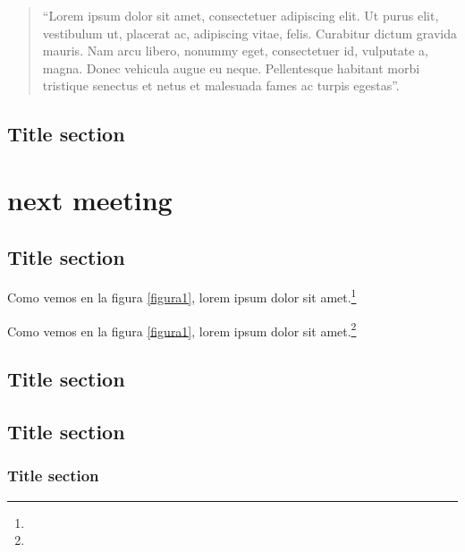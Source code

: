 \documentclass{book}
\begin{document}
\lipsum[3]

\begin{quote}
	\enquote{Lorem ipsum dolor sit amet, consectetuer adipiscing elit. Ut purus elit, vestibulum ut, placerat ac, adipiscing vitae, felis. Curabitur dictum gravida mauris. Nam arcu libero, nonummy eget, consectetuer id, vulputate a, magna. Donec vehicula augue eu neque. Pellentesque habitant morbi tristique senectus et netus et malesuada fames ac turpis egestas}.
\end{quote}

\lipsum[5]

\section{Title section}

\lipsum[1]

\chapter{next meeting}
\label{mychapter2}

\section{Title section}

\lipsum[1]

\lipsum[1]

Como vemos en la figura \ref{figura1}, lorem ipsum dolor sit amet.\footnote{\lipsum[1]}

\lipsum[1]

\lipsum[1]

Como vemos en la figura \ref{figura1}, lorem ipsum dolor sit amet.\footnote{\lipsum[1]}

\lipsum[1]

\lipsum[2]

\section{Title section}

\lipsum[3]

\section{Title section}

\lipsum[1]

\subsection{Title section}
\end{document}
